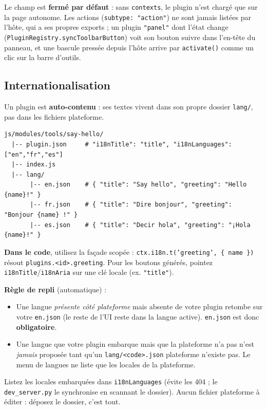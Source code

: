 \documentclass[11pt,a4paper]{article}
\newcommand{\code}[1]{\texttt{#1}}
\newcommand{\filepath}[1]{\texttt{\small #1}}
\begin{document}
Le champ est \textbf{fermé par défaut} : sans \code{contexts}, le plugin n'est
chargé que sur la page autonome. Les actions (\code{subtype: "action"}) ne sont
jamais listées par l'hôte, qui a ses propres exports ; un plugin \code{"panel"}
dont l'état change (\code{PluginRegistry.syncToolbarButton}) voit son bouton
suivre dans l'en-tête du panneau, et une bascule pressée depuis l'hôte arrive
par \code{activate()} comme un clic sur la barre d'outils.

\subsection{Internationalisation}
\label{sec:i18n}

Un plugin est \textbf{auto-contenu} : ses textes vivent dans son propre dossier
\filepath{lang/}, pas dans les fichiers plateforme.

\begin{lstlisting}
js/modules/tools/say-hello/
  |-- plugin.json     # "i18nTitle": "title", "i18nLanguages": ["en","fr","es"]
  |-- index.js
  |-- lang/
       |-- en.json    # { "title": "Say hello", "greeting": "Hello {name}!" }
       |-- fr.json    # { "title": "Dire bonjour", "greeting": "Bonjour {name} !" }
       |-- es.json    # { "title": "Decir hola", "greeting": "¡Hola {name}!" }
\end{lstlisting}

\noindent\textbf{Dans le code}, utilisez la façade scopée : \code{ctx.i18n.t('greeting', \{ name \})}
résout \code{plugins.<id>.greeting}. Pour les boutons générés, pointez
\code{i18nTitle}/\code{i18nAria} sur une clé locale (ex. \code{"title"}).

\noindent\textbf{Règle de repli} (automatique) :
\begin{itemize}[leftmargin=1.4em]
  \item Une langue \emph{présente côté plateforme} mais absente de votre plugin
        retombe sur votre \filepath{en.json} (le reste de l'UI reste dans la
        langue active). \filepath{en.json} est donc \textbf{obligatoire}.
  \item Une langue que votre plugin embarque mais que la plateforme n'a pas
        n'est \emph{jamais} proposée tant qu'un \filepath{lang/<code>.json}
        plateforme n'existe pas. Le menu de langues ne liste que les locales de
        la plateforme.
\end{itemize}

\noindent Listez les locales embarquées dans \code{i18nLanguages} (évite les 404 ;
le \filepath{dev\_server.py} le synchronise en scannant le dossier). Aucun fichier
plateforme à éditer : déposez le dossier, c'est tout.
\end{document}
